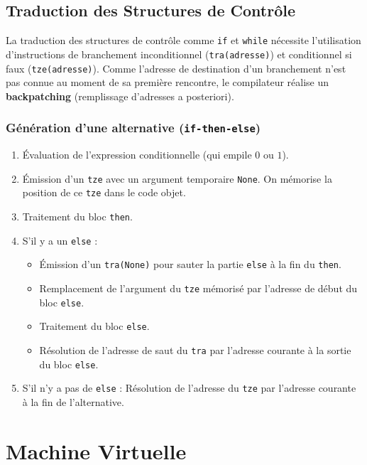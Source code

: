 \documentclass[a4paper, 12pt]{article}
\begin{document}
\subsection{Traduction des Structures de Contrôle}
La traduction des structures de contrôle comme \texttt{if} et \texttt{while} nécessite l'utilisation d'instructions de branchement inconditionnel (\texttt{tra(adresse)}) et conditionnel si faux (\texttt{tze(adresse)}). Comme l'adresse de destination d'un branchement n'est pas connue au moment de sa première rencontre, le compilateur réalise un \textbf{backpatching} (remplissage d'adresses a posteriori).

\subsubsection{Génération d'une alternative (\texttt{if-then-else})}
\begin{enumerate}
    \item Évaluation de l'expression conditionnelle (qui empile $0$ ou $1$).
    \item Émission d'un \texttt{tze} avec un argument temporaire \texttt{None}. On mémorise la position de ce \texttt{tze} dans le code objet.
    \item Traitement du bloc \texttt{then}.
    \item S'il y a un \texttt{else} :
    \begin{itemize}
        \item Émission d'un \texttt{tra(None)} pour sauter la partie \texttt{else} à la fin du \texttt{then}.
        \item Remplacement de l'argument du \texttt{tze} mémorisé par l'adresse de début du bloc \texttt{else}.
        \item Traitement du bloc \texttt{else}.
        \item Résolution de l'adresse de saut du \texttt{tra} par l'adresse courante à la sortie du bloc \texttt{else}.
    \end{itemize}
    \item S'il n'y a pas de \texttt{else} : Résolution de l'adresse du \texttt{tze} par l'adresse courante à la fin de l'alternative.
\end{enumerate}


\newpage

\section{Machine Virtuelle}
\end{document}
